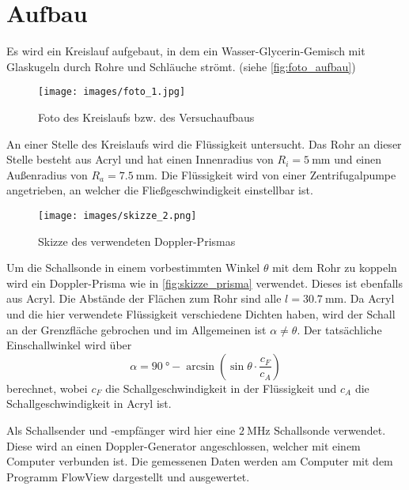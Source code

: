 \section{Aufbau}
\label{sec:Aufbau}

Es wird ein Kreislauf aufgebaut, in dem ein Wasser-Glycerin-Gemisch mit Glaskugeln durch Rohre und Schläuche strömt. (siehe \autoref{fig:foto_aufbau})

\begin{figure}
    \centering
    \texttt{[image: images/foto\_1.jpg]}
    \caption{Foto des Kreislaufs bzw. des Versuchaufbaus}
    \label{fig:foto_aufbau}
\end{figure}

An einer Stelle des Kreislaufs wird die Flüssigkeit untersucht.
Das Rohr an dieser Stelle besteht aus Acryl und hat einen Innenradius von $R_i=\SI{5}{\milli\metre}$ und einen Außenradius von $R_a=\SI{7.5}{\milli\metre}$.
Die Flüssigkeit wird von einer Zentrifugalpumpe angetrieben, an welcher die Fließgeschwindigkeit einstellbar ist.

\FloatBarrier

\begin{figure}
    \centering
    \texttt{[image: images/skizze\_2.png]}
    \caption{Skizze des verwendeten Doppler-Prismas \cite{US3}}
    \label{fig:skizze_prisma}
\end{figure}

Um die Schallsonde in einem vorbestimmten Winkel $\theta$ mit dem Rohr zu koppeln wird ein Doppler-Prisma wie in \autoref{fig:skizze_prisma} verwendet.
Dieses ist ebenfalls aus Acryl.
Die Abstände der Flächen zum Rohr sind alle $l=\SI{30.7}{\milli\metre}$.
Da Acryl und die hier verwendete Flüssigkeit verschiedene Dichten haben, wird der Schall an der Grenzfläche gebrochen und im Allgemeinen ist $\alpha \neq \theta$.
Der tatsächliche Einschallwinkel wird über
\begin{equation}
    \alpha = \SI{90}{\degree} - \arcsin \left( \sin \theta \cdot \frac{c_F}{c_A} \right)
    \label{eq:dopplerwinkel}
\end{equation}
berechnet, wobei $c_F$ die Schallgeschwindigkeit in der Flüssigkeit und $c_A$ die Schallgeschwindigkeit in Acryl ist.


Als Schallsender und -empfänger wird hier eine $\SI{2}{\mega\hertz}$ Schallsonde verwendet.
Diese wird an einen Doppler-Generator angeschlossen, welcher mit einem Computer verbunden ist.
Die gemessenen Daten werden am Computer mit dem Programm FlowView dargestellt und ausgewertet.

